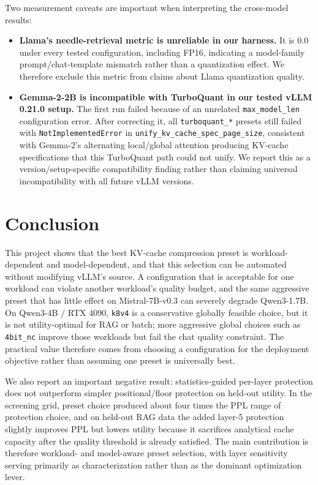 \documentclass[10pt]{article}
\begin{document}
Two measurement caveats are important when interpreting the cross-model results:
\begin{itemize}\itemsep=1pt
\item \textbf{Llama's needle-retrieval metric is unreliable in our harness.} It is 0.0 under every tested configuration, including FP16, indicating a model-family prompt/chat-template mismatch rather than a quantization effect. We therefore exclude this metric from claims about Llama quantization quality.
\item \textbf{Gemma-2-2B is incompatible with TurboQuant in our tested vLLM 0.21.0 setup.} The first run failed because of an unrelated \texttt{max\_model\_len} configuration error. After correcting it, all \texttt{turboquant\_*} presets still failed with \texttt{NotImplementedError} in \texttt{unify\_kv\_cache\_spec\_page\_size}, consistent with Gemma-2's alternating local/global attention producing KV-cache specifications that this TurboQuant path could not unify. We report this as a version/setup-specific compatibility finding rather than claiming universal incompatibility with all future vLLM versions.
\end{itemize}

\section{Conclusion}
This project shows that the best KV-cache compression preset is workload-dependent and model-dependent, and that this selection can be automated without modifying vLLM's source. A configuration that is acceptable for one workload can violate another workload's quality budget, and the same aggressive preset that has little effect on Mistral-7B-v0.3 can severely degrade Qwen3-1.7B. On Qwen3-4B / RTX 4090, \texttt{k8v4} is a conservative globally feasible choice, but it is not utility-optimal for RAG or batch; more aggressive global choices such as \texttt{4bit\_nc} improve those workloads but fail the chat quality constraint. The practical value therefore comes from choosing a configuration for the deployment objective rather than assuming one preset is universally best.

We also report an important negative result: statistics-guided per-layer protection does not outperform simpler positional/floor protection on held-out utility. In the screening grid, preset choice produced about four times the PPL range of protection choice, and on held-out RAG data the added layer-5 protection slightly improves PPL but lowers utility because it sacrifices analytical cache capacity after the quality threshold is already satisfied. The main contribution is therefore workload- and model-aware preset selection, with layer sensitivity serving primarily as characterization rather than as the dominant optimization lever.
\end{document}
